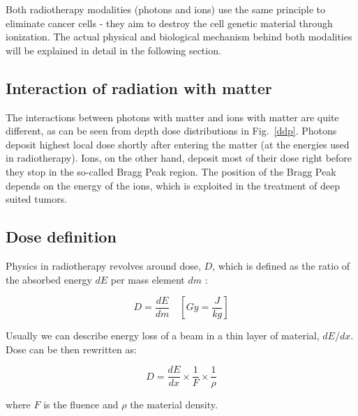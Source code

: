 \documentclass[type=dr, dr=rernat, accentcolor=tud7b,colorbacktitle, bigchapter, openright, twoside, 12pt ]{tudthesis}
\begin{document}
Both radiotherapy modalities (photons and ions) use the same principle to eliminate cancer cells - they aim to destroy the cell genetic material through ionization. The actual physical and biological mechanism behind both modalities will be explained in detail in the following section.

\subsection{Interaction of radiation with matter}

The interactions between photons with matter and ions with matter are quite different, as can be seen from depth dose distributions in Fig.~\ref{ddp}. Photons deposit highest local dose shortly after entering the matter (at the energies used in radiotherapy). Ions, on the other hand, deposit most of their dose right before they stop in the so-called Bragg Peak region. The position of the Bragg Peak depends on the energy of the ions, which is exploited in the treatment
of deep suited tumors.

\subsection{Dose definition}

Physics in radiotherapy revolves around dose, $D$, which is defined as the ratio of the absorbed energy $dE$ per mass element $dm$ \cite{ICRU1993}:

\begin{equation}
 D = \frac{dE}{dm} \quad \left[ Gy = \frac{J}{kg} \right]
\end{equation}

Usually we can describe energy loss of a beam in a thin layer of material, $dE/dx$. Dose can be then rewritten as:

\begin{equation}
 D = \frac{dE}{dx} \times \frac{1}{F} \times \frac{1}{\rho}
\end{equation}

where $F$ is the fluence and $\rho$ the material density.


\newpage
\end{document}
